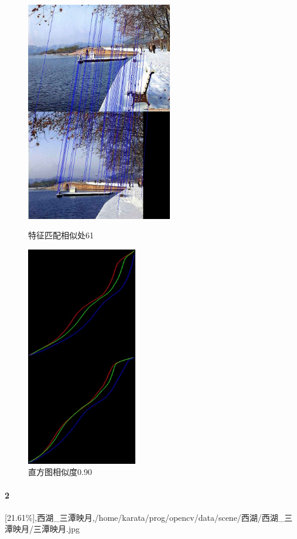 \begin{figure}[htb]
\begin{minipage}[t]{0.5\linewidth}
\centering
\includegraphics[height=3.8in]{断桥.jpg.d/im1sift.jpg}
\caption{特征匹配相似处61}
\label{fig:side:a}
\end{minipage}%
\begin{minipage}[t]{0.5\linewidth}
\centering
\includegraphics[height=3.8in]{断桥.jpg.d/im1hist2.jpg}
\caption{直方图相似度0.90}
\label{fig:side:a}
\end{minipage}%
\end{figure}

\clearpage
\paragraph{2}
[21.61\%],西湖_三潭映月,/home/karata/prog/opencv/data/scene/西湖/西湖_三潭映月/三潭映月.jpg

